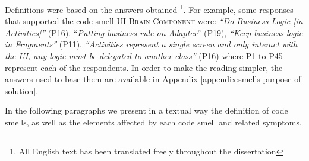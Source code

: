 Definitions were based on the answers obtained \footnote{All English text has been translated freely throughout the dissertation}. For example, some responses that supported the code smell \textsc{\small UI Brain Component} were: \textit{``Do Business Logic [in Activities]''} (P16). ``\textit{Putting business rule on Adapter}'' (P19), \textit{``Keep business logic in Fragments''} (P11), \textit{``Activities represent a single screen and only interact with the UI, any logic must be delegated to another class''} (P16) where P1 to P45 represent each of the respondents. In order to make the reading simpler, the answers used to base them are available in Appendix \ref{appendix:smells-purpose-of-solution}.

In the following paragraphs we present in a textual way the definition of code smells, as well as the elements affected by each code smell and related symptoms.

